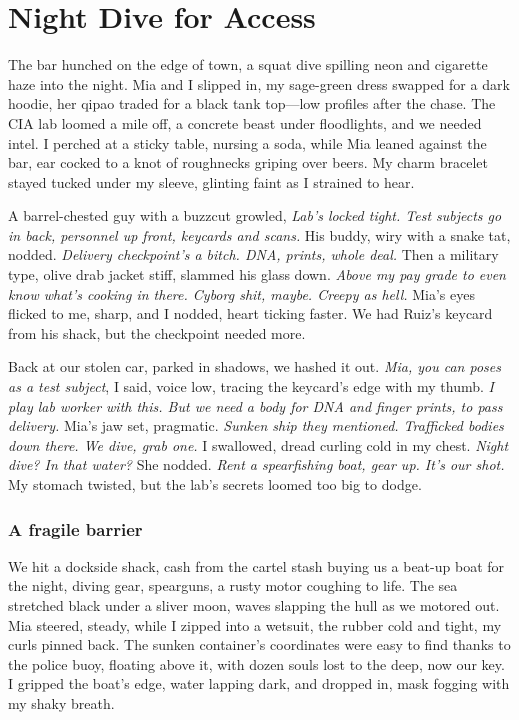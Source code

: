 \documentclass[12pt,oneside]{book} %
\begin{document}
\chapter{Night Dive for Access}

The bar hunched on the edge of town, a squat dive spilling neon and cigarette haze into the night. Mia and I slipped in, my sage-green dress swapped for a dark hoodie, her qipao traded for a black tank top—low profiles after the chase. The CIA lab loomed a mile off, a concrete beast under floodlights, and we needed intel. I perched at a sticky table, nursing a soda, while Mia leaned against the bar, ear cocked to a knot of roughnecks griping over beers. My charm bracelet stayed tucked under my sleeve, glinting faint as I strained to hear.

A barrel-chested guy with a buzzcut growled, \textit{Lab’s locked tight. Test subjects go in back, personnel up front, keycards and scans.} His buddy, wiry with a snake tat, nodded. \textit{Delivery checkpoint’s a bitch. DNA, prints, whole deal.} Then a military type, olive drab jacket stiff, slammed his glass down. \textit{Above my pay grade to even know what’s cooking in there. Cyborg shit, maybe. Creepy as hell.} Mia’s eyes flicked to me, sharp, and I nodded, heart ticking faster. We had Ruiz’s keycard from his shack, but the checkpoint needed more.

Back at our stolen car, parked in shadows, we hashed it out. \textit{Mia, you can poses as a test subject}, I said, voice low, tracing the keycard’s edge with my thumb. \textit{I play lab worker with this. But we need a body for DNA and finger prints, to pass delivery.} Mia’s jaw set, pragmatic. \textit{Sunken ship they mentioned. Trafficked bodies down there. We dive, grab one.} I swallowed, dread curling cold in my chest. \textit{Night dive? In that water?} She nodded. \textit{Rent a spearfishing boat, gear up. It’s our shot.} My stomach twisted, but the lab’s secrets loomed too big to dodge.

\subsection*{A fragile barrier}

We hit a dockside shack, cash from the cartel stash buying us a beat-up boat for the night, diving gear, spearguns, a rusty motor coughing to life. The sea stretched black under a sliver moon, waves slapping the hull as we motored out. Mia steered, steady, while I zipped into a wetsuit, the rubber cold and tight, my curls pinned back. The sunken container's coordinates were easy to find thanks to the police buoy, floating above it, with dozen souls lost to the deep, now our key. I gripped the boat’s edge, water lapping dark, and dropped in, mask fogging with my shaky breath.
\end{document}
